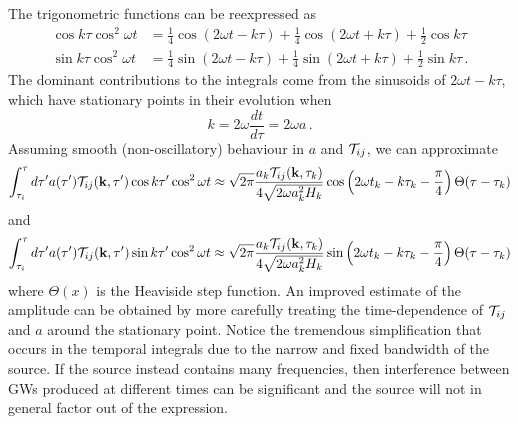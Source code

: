 \documentclass{revtex4}
\begin{document}
The trigonometric functions can be reexpressed as
\begin{subequations}
\begin{align}
  \cos k\tau\cos^2\omega t &= \frac{1}{4}\cos(2\omega t-k\tau) + \frac{1}{4}\cos(2\omega t+k\tau) + \frac{1}{2}\cos k\tau \\
  \sin k\tau\cos^2\omega t &= \frac{1}{4}\sin(2\omega t-k\tau) + \frac{1}{4}\sin(2\omega t+k\tau) + \frac{1}{2}\sin k\tau \, .
\end{align}
\end{subequations}
The dominant contributions to the integrals come from the sinusoids of $2\omega t - k\tau$, which have stationary points in their evolution when
\begin{equation}
  k = 2\omega\frac{dt}{d\tau} = 2\omega a \, .
\end{equation}
Assuming smooth (non-oscillatory) behaviour in $a$ and $\mathcal{T}_{ij}$, we can approximate
\begin{equation}
  \int_{\tau_i}^\tau d\tau' a(\tau')\mathcal{T}_{ij}({\bf k},\tau')\cos k\tau'\cos^2\omega t \approx \sqrt{2\pi}\frac{a_k\mathcal{T}_{ij}({\bf k},\tau_k)}{4\sqrt{2\omega a^2_kH_k}}\cos\left(2\omega t_k -k\tau_k-\frac{\pi}{4}\right)\Theta(\tau - \tau_k)
\end{equation}
and
\begin{equation}
  \int_{\tau_i}^\tau d\tau' a(\tau')\mathcal{T}_{ij}({{\bf k}},\tau')\sin k\tau'\cos^2\omega t \approx \sqrt{2\pi}\frac{a_k\mathcal{T}_{ij}({\bf k},\tau_k)}{4\sqrt{2\omega a^2_kH_k}}\sin\left(2\omega t_k -k\tau_k-\frac{\pi}{4}\right)\Theta(\tau - \tau_k)
\end{equation}
where $\Theta(x)$ is the Heaviside step function.
An improved estimate of the amplitude can be obtained by more carefully treating the time-dependence of $\mathcal{T}_{ij}$ and $a$ around the stationary point.
Notice the tremendous simplification that occurs in the temporal integrals due to the narrow and fixed bandwidth of the source.
If the source instead contains many frequencies, then interference between GWs produced at different times can be significant and the source will not in general factor out of the expression.
\end{document}
